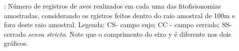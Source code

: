 \label{fig:aves2}: Número de registros de aves realizados em cada uma das fitofisionomias amostradas, considerando os rgistros feitos dentro do raio amostral de 100m e fora deste raio amostral. Legenda: CS- campo sujo; CC -  campo cerrado; SS- cerrado \textit{sensu stricto}. Note que o comprimento do eixo y é diferente nos dois gráficos.
